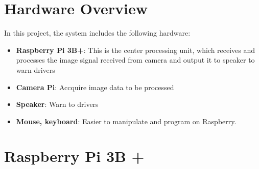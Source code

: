 \section{Hardware Overview}
    In this project, the system includes the following hardware:
    \begin{itemize}
        \item \textbf{Raspberry Pi 3B+}: This is the center processing unit, which receives and processes the image signal received from camera and output it to speaker to warn drivers
        \item \textbf{Camera Pi}: Accquire image data to be processed
        \item \textbf{Speaker}: Warn to drivers
        \item \textbf{Mouse, keyboard}: Easier to manipulate and program on Raspberry.
    \end{itemize}

\section{Raspberry Pi 3B +}
